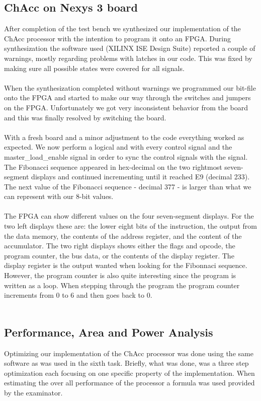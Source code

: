 \documentclass[a4paper,11pt]{article}
\begin{document}
\subsection{ChAcc on Nexys 3 board}
After completion of the test bench we synthesized our implementation of the 
ChAcc processor with the intention to program it onto an FPGA. During 
synthesization the software used (XILINX ISE Design Suite) reported a couple 
of warnings, mostly regarding problems with latches in our code. This was 
fixed by making sure all possible states were covered for all signals.\\\\
\noindent
When the synthesization  completed without warnings we programmed our bit-file 
onto the FPGA and started to make our way through the switches and jumpers on 
the FPGA. Unfortunately we got very inconsistent behavior from the board and 
this was finally resolved by switching the board.\\\\
\noindent
With a fresh board and a minor adjustment to the code everything worked as 
expected. We now perform a logical and with every control signal and the 
master\_load\_enable signal in order to sync the control signals with the 
signal. The Fibonacci sequence appeared in hex-decimal on the two rightmost 
seven-segment displays and continued incrementing until it reached E9 
(decimal 233). The next value of the Fibonacci sequence - decimal 377 - is 
larger than what we can represent with our 8-bit values.\\\\
\noindent
The FPGA can show different values on the four seven-segment displays. For 
the two left displays these are: the lower eight bits of the instruction, 
the output from the data memory, the contents of the address register, and 
the content of the accumulator. The two right displays shows either the 
flags and opcode, the program counter, the bus data, or the contents of the 
display register. The display register is the output wanted when looking for 
the Fibonnaci sequence. However, the program counter is also quite interesting 
since the program is written as a loop. When stepping through the program 
the program counter increments from 0 to 6 and then goes back to 0.\\\\
\noindent

\subsection{Performance, Area and Power Analysis}
Optimizing our implementation of the ChAcc processor was done using the 
same software as was used in the sixth task. Briefly, what was done, was a 
three step optimization each focusing on one specific property of the 
implementation. When estimating the over all performance of the processor 
a formula was used provided by the examinator.
\end{document}
